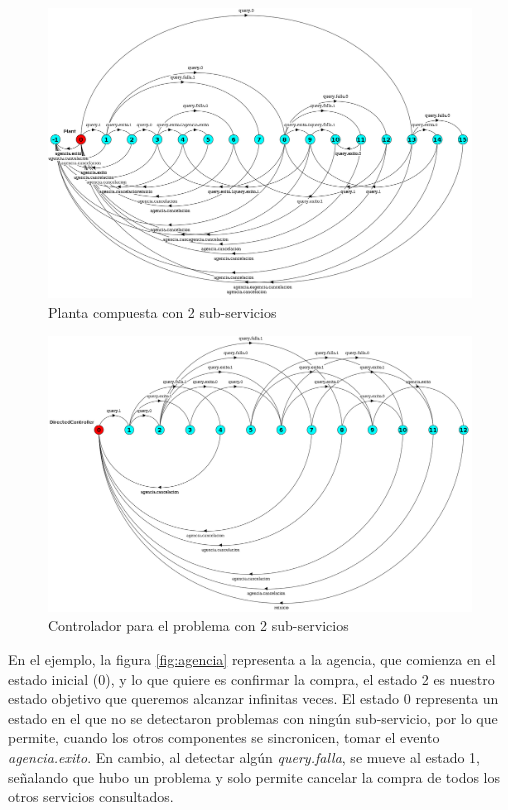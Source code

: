 \begin{figure}[htb]
	\includegraphics[width=\linewidth]{figures/ejemploServicios/N2Planta.png}  
	\caption{Planta compuesta con 2 sub-servicios}
	\label{fig:N2}
\end{figure}

\begin{figure}[htb]
	\includegraphics[width=\linewidth]{figures/ejemploServicios/N2Controlador.png}  
	\caption{Controlador para el problema con 2 sub-servicios}
	\label{fig:N2-control}
\end{figure}

En el ejemplo, la figura \ref{fig:agencia} representa a la agencia, que comienza en el estado inicial (0), y lo que quiere es confirmar la compra, el estado 2 es nuestro estado objetivo que queremos alcanzar infinitas veces. El estado 0 representa un estado en el que no se detectaron problemas con ningún sub-servicio, por lo que permite, cuando los otros componentes se sincronicen, tomar el evento \textit{agencia.exito}. En cambio, al detectar algún \textit{query.falla}, se mueve al estado 1, señalando que hubo un problema y solo permite cancelar la compra de todos los otros servicios consultados.

